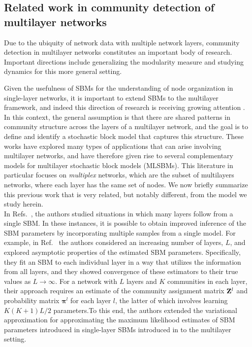 \subsection{Related work in community detection of multilayer networks}
Due to the ubiquity of network data with multiple network layers, community detection in multilayer networks constitutes an important body of research. Important directions include generalizing the modularity measure \cite{muchamultislice} and studying dynamics \cite{manlio2} for this more general setting. 

Given the usefulness of SBMs for the understanding of node organization in single-layer networks, it is important to extend SBMs to the multilayer framework, and indeed this direction of research is receiving growing attention  \cite{airoldi,mlsbm1,barbillon,catala,thiagomlsbm}. In this context, the general assumption is that there are shared patterns in community structure across the layers of a multilayer network, and the goal is to define and identify a stochastic block model that captures this structure. These works have explored many types of applications that can arise involving multilayer networks,
%
and have therefore given rise to several complementary models for multilayer stochastic block models (MLSBMs). This literature in particular focuses on \emph{multiplex} networks, which are the subset of multilayers networks, where each layer has the same set of nodes. We now briefly summarize this previous work that is very related, but notably different, from the model we study herein.
%
\\\indent 
 In Refs.~\cite{airoldi,mlsbm1,barbillon}, the authors studied situations in which many layers follow from a single SBM. In these instances, it is possible to obtain improved inference of the SBM parameters by incorporating multiple samples from a single model. For example, in Ref.~\cite{airoldi} the authors considered an increasing number of layers, $L$, and explored asymptotic properties of the estimated SBM parameters. Specifically, they fit an SBM to each individual layer in a way that utilizes the information from all layers, and they showed convergence of these estimators to their true values as $L\to\infty$. %
For a network with $L$ layers and $K$ communities in each layer, their approach requires  an estimate of the community assignment matrix ${\bf Z}^l$ and probability matrix ${\boldsymbol \pi}^l$ for each layer $l$, the latter of which involves learning $K(K+1)L/2$ parameters.To this end, the authors extended the variational approximation for approximating the maximum likelihood estimates of SBM parameters introduced in single-layer SBMs introduced in \cite{dudin} to the multilayer setting.
